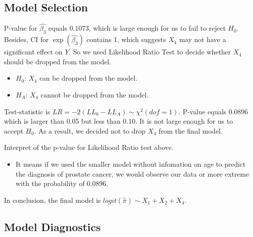 \documentclass[a4paper,11pt,onecolumn,twoside]{article}
\begin{document}
\subsection{Model Selection}
P-value for $\hat{\beta_{3}}$ equals $0.1073$, which is large enough for us to fail to reject $H_{0}$. Besides, CI for $\exp(\hat{\beta_{3}})$ contains 1, which suggests $X_{4}$ may not have a significant effect on $Y$. So we used Likelihood Ratio Test to decide whether $X_{4}$ should be dropped from the model.
\begin{itemize}
	\item $H_{0}$: $X_{4}$ can be dropped from the model. 
	\item $H_{A}$: $X_{4}$ cannot be dropped from the model.
\end{itemize}
\par
Test-statistic is $LR = -2(LL_{0}-LL_{A})\sim \chi^{2}(dof = 1)$. P-value equals $0.0896$ which is larger than 0.05 but less than $0.10$. It is not large enough for us to accept $H_{0}$. As a result, we decided not to drop $X_{4}$ from the final model.\par
Interpret of the p-value for Likelihood Ratio test above.
\begin{itemize}
	\item It means if we used the smaller model without infomation on age to predict the diagnosis of prostate cancer, we would observe our data or more extreme with the probability of 0.0896.
\end{itemize}
\par
In conclusion, the final model is $logit(\hat{\pi}) \sim X_{1}+X_{2}+X_{4}$.\par
\subsection{Model Diagnostics}
\end{document}
